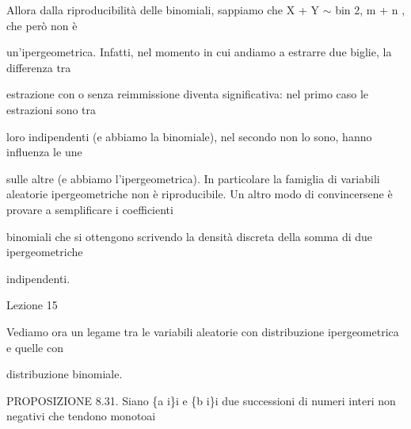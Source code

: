 \documentclass[a4paper,portrait,12pt]{article}
\begin{document}
\begin{flushleft}
Allora dalla riproducibilit\`{a} delle binomiali, sappiamo che X + Y $\sim$ bin 2, m + n , che per\`{o} non \`{e}
\end{flushleft}


\begin{flushleft}
un'ipergeometrica. Infatti, nel momento in cui andiamo a estrarre due biglie, la differenza tra
\end{flushleft}


\begin{flushleft}
estrazione con o senza reimmissione diventa significativa: nel primo caso le estrazioni sono tra
\end{flushleft}


\begin{flushleft}
loro indipendenti (e abbiamo la binomiale), nel secondo non lo sono, hanno influenza le une
\end{flushleft}


\begin{flushleft}
sulle altre (e abbiamo l'ipergeometrica). In particolare la famiglia di variabili aleatorie ipergeometriche non \`{e} riproducibile. Un altro modo di convincersene \`{e} provare a semplificare i coefficienti
\end{flushleft}


\begin{flushleft}
binomiali che si ottengono scrivendo la densit\`{a} discreta della somma di due ipergeometriche
\end{flushleft}


\begin{flushleft}
indipendenti.
\end{flushleft}


\begin{flushleft}
Lezione 15
\end{flushleft}





\begin{flushleft}
Vediamo ora un legame tra le variabili aleatorie con distribuzione ipergeometrica e quelle con
\end{flushleft}


\begin{flushleft}
distribuzione binomiale.
\end{flushleft}


\begin{flushleft}
PROPOSIZIONE 8.31. Siano \{a i\}i e \{b i\}i due successioni di numeri interi non negativi che tendono monotoai
\end{flushleft}
\end{document}
